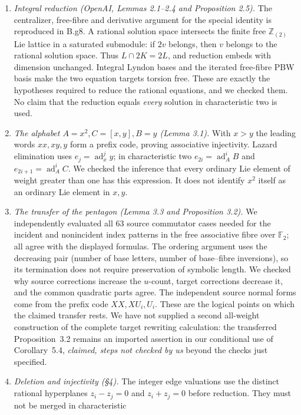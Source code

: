 \begin{enumerate}[leftmargin=*]
\item \emph{Integral reduction (OpenAI, Lemmas 2.1--2.4 and
Proposition 2.5).}  The centralizer, free-fibre and derivative argument
for the special identity is reproduced in B.g8.  A rational solution
space intersects the finite free $\mathbb Z_{(2)}$ Lie lattice in a
saturated submodule: if $2v$ belongs, then $v$ belongs to the rational
solution space.  Thus $L\cap2K=2L$, and reduction embeds with dimension
unchanged.  Integral Lyndon bases and the iterated free-fibre PBW basis
make the two equation targets torsion free.  These are exactly the
hypotheses required to reduce the rational equations, and we checked
them.  No claim that the reduction equals \emph{every} solution in
characteristic two is used.
\item \emph{The alphabet $A=x^2,C=[x,y],B=y$ (Lemma 3.1).}
With $x>y$ the leading words $xx,xy,y$ form a prefix code, proving
associative injectivity.  Lazard elimination uses
$e_j=\operatorname{ad}_x^j y$; in characteristic two
$e_{2i}=\operatorname{ad}_A^iB$ and
$e_{2i+1}=\operatorname{ad}_A^iC$.  We checked the inference that every
ordinary Lie element of weight greater than one has this expression.
It does not identify $x^2$ itself as an ordinary Lie element in $x,y$.
\item \emph{The transfer of the pentagon (Lemma 3.3 and
Proposition 3.2).}  We independently evaluated all 63 source
commutator cases needed for the incident and nonincident index patterns
in the free associative fibre over $\mathbb F_2$; all agree with the
displayed formulas.  The ordering argument uses the decreasing pair
(number of base letters, number of base--fibre inversions), so its
termination does not require preservation of symbolic length.
We checked why source corrections increase the $u$-count, target
corrections decrease it, and the common quadratic parts agree.
The independent source normal forms come from the prefix code
$XX,XU_i,U_i$.  These are the logical points on which the claimed
transfer rests.  We have not supplied a second all-weight construction
of the complete target rewriting calculation: the transferred
Proposition~3.2 remains an imported assertion in our conditional use
of Corollary~5.4, \emph{claimed, steps not checked by us} beyond the
checks just specified.
\item \emph{Deletion and injectivity (\S4).}  The integer edge
valuations use the distinct rational hyperplanes $z_i-z_j=0$ and
$z_i+z_j=0$ before reduction.  They must not be merged in characteristic

\end{enumerate}
